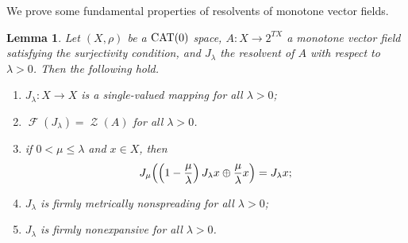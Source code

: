 \documentclass[draft]{amsart}
\numberwithin{equation}{section}
\DeclareMathOperator{\Fix}{\mathcal{F}}
\DeclareMathOperator{\Zer}{\mathcal{Z}}
\newcommand{\CAT}{\textup{CAT}}
\theoremstyle{plain}
\newtheorem{lemma}[theorem]{Lemma}
\theoremstyle{definition}
\theoremstyle{remark}
\begin{document}
We prove some fundamental properties 
of resolvents of monotone vector fields. 

\begin{lemma}\label{lem:res-fund}
 Let $(X, \rho)$ be a $\CAT(0)$ space, 
 $A\colon X\to 2^{TX}$ a monotone vector field 
 satisfying the surjectivity condition, and 
 $J_{\lambda}$ the resolvent of $A$ 
 with respect to $\lambda>0$.  
 Then the following hold. 
 \begin{enumerate}
  \item[(i)] $J_{\lambda}\colon X\to X$ 
 is a single-valued mapping for all $\lambda>0$; 
  \item[(ii)] $\Fix (J_{\lambda})=\Zer (A)$ for all $\lambda>0$. 
  \item[(iii)] if $0<\mu \leq \lambda$ and $x\in X$, then 
 \[
  J_{\mu}\Bigl(\left(1-\frac{\mu}{\lambda}\right)J_{\lambda}x 
  \oplus \frac{\mu}{\lambda}x\Bigr) = J_{\lambda}x; 
 \] 
  \item[(iv)] $J_{\lambda}$ is firmly metrically nonspreading 
 for all $\lambda>0$;
  \item[(v)] $J_{\lambda}$ is firmly nonexpansive for all $\lambda>0$. 
 \end{enumerate}
\end{lemma}
\end{document}
